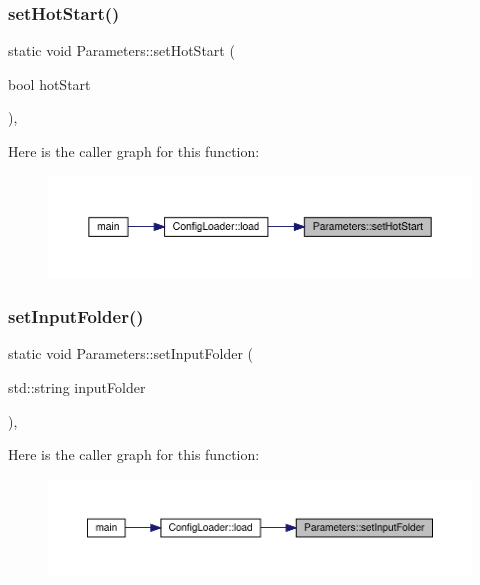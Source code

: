 \subsubsection{\texorpdfstring{setHotStart()}{setHotStart()}}
{\footnotesize\ttfamily static void Parameters\+::set\+Hot\+Start (\begin{DoxyParamCaption}\item[{bool}]{hot\+Start }\end{DoxyParamCaption})\hspace{0.3cm}{\ttfamily [inline]}, {\ttfamily [static]}}

Here is the caller graph for this function\+:
\nopagebreak
\begin{figure}[H]
\begin{center}
\leavevmode
\includegraphics[width=350pt]{class_parameters_af4a107cdc7b6400685fdcbd33983a16f_icgraph}
\end{center}
\end{figure}
\mbox{\label{class_parameters_a64572c0531cc65e5d1c0fc4c8295a572}} 
\subsubsection{\texorpdfstring{setInputFolder()}{setInputFolder()}}
{\footnotesize\ttfamily static void Parameters\+::set\+Input\+Folder (\begin{DoxyParamCaption}\item[{std\+::string}]{input\+Folder }\end{DoxyParamCaption})\hspace{0.3cm}{\ttfamily [inline]}, {\ttfamily [static]}}

Here is the caller graph for this function\+:
\nopagebreak
\begin{figure}[H]
\begin{center}
\leavevmode
\includegraphics[width=350pt]{class_parameters_a64572c0531cc65e5d1c0fc4c8295a572_icgraph}
\end{center}
\end{figure}
\mbox{\label{class_parameters_a5ed3d5d9a08ceecbd3378da54e717794}} 

